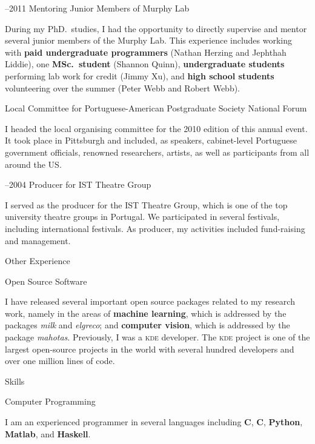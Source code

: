 \documentclass{article}
\renewcommand\section[1]{%
    \par\vspace{2em}\penalty-100%
    {\subhead #1}%
    \par\penalty100\vspace{1em}\penalty100%
}
\newcommand\cvitem[2][\relax]{%
    \par\vspace{.8em}
    \if\relax#1\else{\Date \textcolor{medg}{#1}}\hspace{1em}\fi%
    {\CvItem #2}%
    \par\vspace{.4em}
}
\newcommand\ignore[1]{\relax}
\begin{document}
\cvitem[2008--2011]{Mentoring Junior Members of Murphy Lab}
During my PhD.\ studies, I had the opportunity to directly supervise and mentor
several junior members of the Murphy Lab. This experience includes working with
\textbf{paid undergraduate programmers} (Nathan Herzing and Jephthah
Liddie\ignore{---both currently still students at Carnegie Mellon University}),
one \textbf{MSc.\ student} (Shannon Quinn\ignore{, currently a doctoral student
in the Joint Carnegie Mellon University--University of Pittsburgh PhD.\ Program
in Computational Biology}), \textbf{undergraduate students} performing lab work
for credit (Jimmy Xu), and \textbf{high school students} volunteering over the
summer (Peter Webb and Robert Webb).


\cvitem[2010]{Local Committee for Portuguese-American Postgraduate Society National Forum}
I headed the local organising committee for the 2010 edition of this annual
event. It took place in Pittsburgh and included, as speakers, cabinet-level
Portuguese government officials, renowned researchers, artists, as well as
participants from all around the US.

\cvitem[2002--2004]{Producer for IST Theatre Group}
I served as the producer for the IST Theatre Group, which is one of the top
university theatre groups in Portugal. We participated in several festivals,
including international festivals. As producer, my activities included
fund-raising and management.

\section{Other Experience}

\cvitem{Open Source Software}
I have released several important open source packages related to my research
work, namely in the areas of \textbf{machine learning}, which is addressed by
the packages \textit{milk} and \textit{elgreco}; and \textbf{computer vision},
which is addressed by the package \textit{mahotas}. Previously, I was a
\textsc{kde} developer. The \textsc{kde} project is one of the largest
open-source projects in the world with several hundred developers and over one
million lines of code.

\section{Skills}

\cvitem{Computer Programming}
I am an experienced programmer in several languages including \textbf{C},
\textbf{C\raisebox{.2em}{\tiny \bf ++}}, \textbf{Python}, \textbf{Matlab}, and
\textbf{Haskell}.
\end{document}
